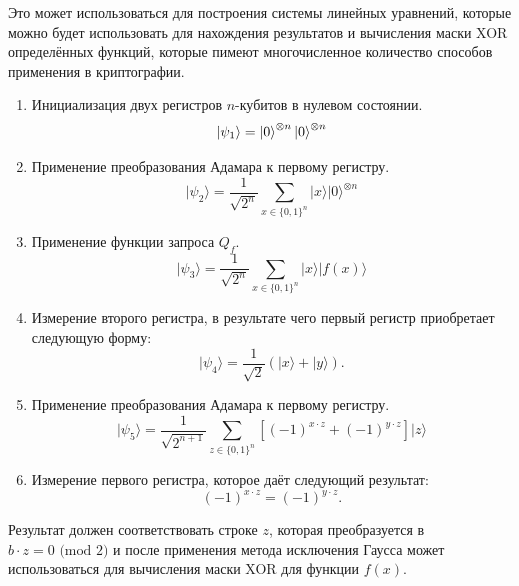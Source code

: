 \documentclass{mrl}
\begin{document}
Это может использоваться для построения системы линейных уравнений, которые можно будет использовать для нахождения результатов и вычисления маски XOR определённых функций, которые пимеют многочисленное количество способов применения в криптографии.
\begin{enumerate}
\item Инициализация двух регистров $n$-кубитов в нулевом состоянии.
\begin{equation}
    \lvert \psi_1 \rangle = \ket{0} ^{\otimes n} \ket{0} ^{\otimes n}
\end{equation}

\item Применение преобразования Адамара к первому регистру.
\begin{equation}
    \lvert \psi_2 \rangle = \frac{1}{\sqrt{2^n}} \sum_{x \in \{0,1\}^{n} } \lvert x \rangle\lvert 0 \rangle^{\otimes n}
\end{equation}

\item Применение функции запроса $Q_f$. 
\begin{equation}
    \lvert \psi_3 \rangle = \frac{1}{\sqrt{2^n}} \sum_{x \in \{0,1\}^{n} } \lvert x \rangle \lvert f(x) \rangle
\end{equation}

\item Измерение второго регистра, в результате чего первый регистр приобретает следующую форму:
\begin{equation}
    \lvert \psi_4 \rangle = \frac{1}{\sqrt{2}}  \left( \lvert x \rangle + \lvert y \rangle \right).
\end{equation}

\item Применение преобразования Адамара к первому регистру.
\begin{equation}
    \lvert \psi_5 \rangle = \frac{1}{\sqrt{2^{n+1}}} \sum_{z \in \{0,1\}^{n} } \left[  (-1)^{x \cdot z} + (-1)^{y \cdot z} \right]  \lvert z \rangle
\end{equation}

\item Измерение первого регистра, которое даёт следующий результат:
\begin{equation}
    (-1)^{x \cdot z} = (-1)^{y \cdot z}.
\end{equation}
\end{enumerate}

Результат должен соответствовать строке $z$, которая преобразуется в $ b \cdot z = 0 \text{ (mod 2)} $ и после применения метода исключения Гаусса может использоваться для вычисления маски XOR для функции $f(x)$. 
\end{document}
